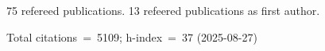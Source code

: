 75 refereed publications. 13 refeered publications as first author.

Total citations~=~5109; h-index~=~37 (2025-08-27)